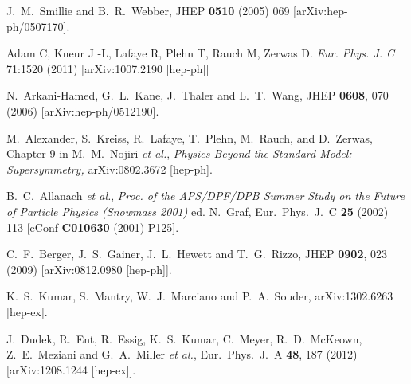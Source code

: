 \begin{thebibliography}{99}
  J.~M.~Smillie and B.~R.~Webber,
  JHEP {\bf 0510} (2005) 069
  [arXiv:hep-ph/0507170].


 Adam C,  Kneur J -L, Lafaye R, Plehn T, Rauch M, Zerwas D.
\textit{Eur. Phys. J. C} 71:1520 (2011) 
 [arXiv:1007.2190 [hep-ph]]
 
  N.~Arkani-Hamed, G.~L.~Kane, J.~Thaler and L.~T.~Wang,
  JHEP {\bf 0608}, 070 (2006)
  [arXiv:hep-ph/0512190].


 M.~Alexander, S.~Kreiss, R.~Lafaye, T.~Plehn,
M.~Rauch, and D.~Zerwas, Chapter 9 in M.~M.~Nojiri \textit{et al.},
\textit{Physics Beyond the Standard Model: Supersymmetry,}
arXiv:0802.3672 [hep-ph]. %

 B.~C.~Allanach \textit{et al.},
\textit{Proc. of the APS/DPF/DPB Summer Study on the Future of
Particle Physics (Snowmass 2001) } ed. N.~Graf, Eur.\ Phys.\ J.\ C
\textbf{25} (2002)
113 [eConf \textbf{C010630} (2001) P125]. %

  C.~F.~Berger, J.~S.~Gainer, J.~L.~Hewett and T.~G.~Rizzo,
  JHEP {\bf 0902}, 023 (2009)
  [arXiv:0812.0980 [hep-ph]].


  K.~S.~Kumar, S.~Mantry, W.~J.~Marciano and P.~A.~Souder,
  arXiv:1302.6263 [hep-ex].

  J.~Dudek, R.~Ent, R.~Essig, K.~S.~Kumar, C.~Meyer, R.~D.~McKeown, Z.~E.~Meziani and G.~A.~Miller {\it et al.},
  Eur.\ Phys.\ J.\ A {\bf 48}, 187 (2012)
  [arXiv:1208.1244 [hep-ex]].


\end{thebibliography}
